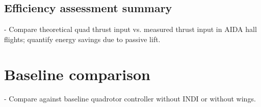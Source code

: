 
\subsection{Efficiency assessment summary}
- Compare theoretical quad thrust input vs. measured thrust input in AIDA hall flights; quantify energy savings due to passive lift.

\section{Baseline comparison}
- Compare against baseline quadrotor controller without INDI or without wings.
